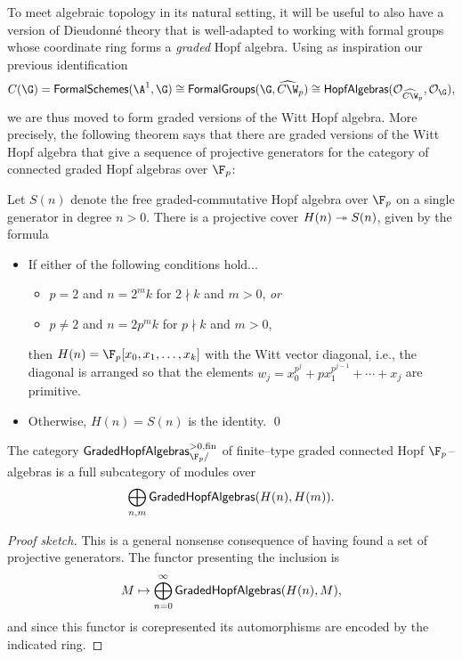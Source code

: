 To meet algebraic topology in its natural setting, it will be useful to also have a version of Dieudonn\'e theory that is well-adapted to working with formal groups whose coordinate ring forms a \emph{graded} Hopf algebra.  Using as inspiration our previous identification \[C(\G) = \CatOf{FormalSchemes}(\A^1, \G) \cong \CatOf{FormalGroups}(\G, \widehat{C\W}_p) \cong \CatOf{HopfAlgebras}(\sheaf O_{\widehat{C\W}_p}, \sheaf O_{\G}),\] we are thus moved to form graded versions of the Witt Hopf algebra.  More precisely, the following theorem says that there are graded versions of the Witt Hopf algebra that give a sequence of projective generators for the category of connected graded Hopf algebras over $\F_p$:

\begin{theorem}
Let $S(n)$ denote the free graded-commutative Hopf algebra over $\F_p$ on a single generator in degree $n > 0$.  There is a projective cover $H(n) \twoheadrightarrow S(n)$, given by the formula
\begin{itemize}
\item If either of the following conditions hold...
\begin{itemize}
\item $p = 2$ and $n = 2^m k$ for $2 \nmid k$ and $m > 0$, \emph{or}
\item $p \ne 2$ and $n = 2p^m k$ for $p \nmid k$ and $m > 0$,
\end{itemize}
then $H(n) = \F_p[x_0, x_1, \ldots, x_k]$ with the Witt vector diagonal, i.e., the diagonal is arranged so that the elements $w_j = x_0^{p^j} + p x_1^{p^{j-1}} + \cdots + x_j$ are primitive.
\item Otherwise, $H(n) = S(n)$ is the identity.
\qed
\end{itemize}
\end{theorem}

\begin{corollary}
The category $\CatOf{GradedHopfAlgebras}^{> 0, \fin}_{\F_p/}$ of finite--type graded connected Hopf $\F_p$--algebras is a full subcategory of modules over \[\bigoplus_{n, m} \mathsf{GradedHopfAlgebras}(H(n), H(m)).\]
\end{corollary}
\begin{proof}[Proof sketch]
This is a general nonsense consequence of having found a set of projective generators.  The functor presenting the inclusion is \[M \mapsto \bigoplus_{n=0}^\infty \mathsf{GradedHopfAlgebras}(H(n), M),\] and since this functor is corepresented its automorphisms are encoded by the indicated ring.
\end{proof}


